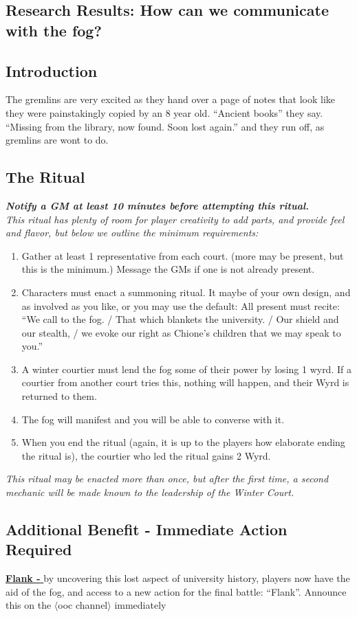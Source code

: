 \documentclass[white]{gl2018}
\begin{document}
\name{\wWinterRitual{}}
\begin{center}
\section*{Research Results: How can we communicate with the fog?}
\end{center}
\subsection*{Introduction}
The gremlins are very excited as they hand over a page of notes that look like they were painstakingly copied by an 8 year old. ``Ancient books'' they say. ``Missing from the library, now found. Soon lost again.'' and they run off, as gremlins are wont to do.

\subsection*{The Ritual}
\emph{{\bf Notify a GM at least 10 minutes before attempting this ritual.}}\\
\emph{This ritual has plenty of room for player creativity to add parts, and provide feel and flavor, but below we outline the minimum requirements:}
\begin{enumerate}
\item Gather at least 1 representative from each court. (more may be present, but this is the minimum.) Message the GMs if one is not already present.
\item Characters must enact a summoning ritual. It maybe of your own design, and as involved as you like, or you may use the default: All present must recite: ``We call to the fog. / That which blankets the university. / Our shield and our stealth, / we evoke our right as Chione’s children that we may speak to you.''
\item A winter courtier must lend the fog some of their power by losing 1 wyrd. If a courtier from another court tries this, nothing will happen, and their Wyrd is returned to them.
\item The fog will manifest and you will be able to converse with it.
\item When you end the ritual (again, it is up to the players how elaborate ending the ritual is), the courtier who led the ritual gains 2 Wyrd.
\end{enumerate}

\emph{This ritual may be enacted more than once, but after the first time, a second mechanic will be made known to the leadership of the Winter Court.}

\subsection*{Additional Benefit - Immediate Action Required}
\underline{{\bf Flank - }}by uncovering this lost aspect of university history, players now have the aid of the fog, and access to a new action for the final battle: “Flank”. Announce this on the $\langle$ooc channel$\rangle$ immediately
\end{document}
